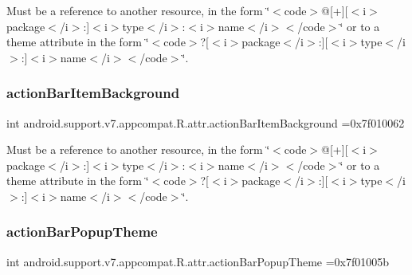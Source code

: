 Must be a reference to another resource, in the form \char`\"{}$<$code$>$@\mbox{[}+\mbox{]}\mbox{[}$<$i$>$package$<$/i$>$\+:\mbox{]}$<$i$>$type$<$/i$>$\+:$<$i$>$name$<$/i$>$$<$/code$>$\char`\"{} or to a theme attribute in the form \char`\"{}$<$code$>$?\mbox{[}$<$i$>$package$<$/i$>$\+:\mbox{]}\mbox{[}$<$i$>$type$<$/i$>$\+:\mbox{]}$<$i$>$name$<$/i$>$$<$/code$>$\char`\"{}. \mbox{\label{classandroid_1_1support_1_1v7_1_1appcompat_1_1R_1_1attr_a5ebb4ad8ffb85e6e340393c3a255ce33}} 
\subsubsection{\texorpdfstring{action\+Bar\+Item\+Background}{actionBarItemBackground}}
{\footnotesize\ttfamily int android.\+support.\+v7.\+appcompat.\+R.\+attr.\+action\+Bar\+Item\+Background =0x7f010062\hspace{0.3cm}{\ttfamily [static]}}

Must be a reference to another resource, in the form \char`\"{}$<$code$>$@\mbox{[}+\mbox{]}\mbox{[}$<$i$>$package$<$/i$>$\+:\mbox{]}$<$i$>$type$<$/i$>$\+:$<$i$>$name$<$/i$>$$<$/code$>$\char`\"{} or to a theme attribute in the form \char`\"{}$<$code$>$?\mbox{[}$<$i$>$package$<$/i$>$\+:\mbox{]}\mbox{[}$<$i$>$type$<$/i$>$\+:\mbox{]}$<$i$>$name$<$/i$>$$<$/code$>$\char`\"{}. \mbox{\label{classandroid_1_1support_1_1v7_1_1appcompat_1_1R_1_1attr_a2b592c6f7020c21bbbc10b803f74ec6d}} 
\subsubsection{\texorpdfstring{action\+Bar\+Popup\+Theme}{actionBarPopupTheme}}
{\footnotesize\ttfamily int android.\+support.\+v7.\+appcompat.\+R.\+attr.\+action\+Bar\+Popup\+Theme =0x7f01005b\hspace{0.3cm}{\ttfamily [static]}}


